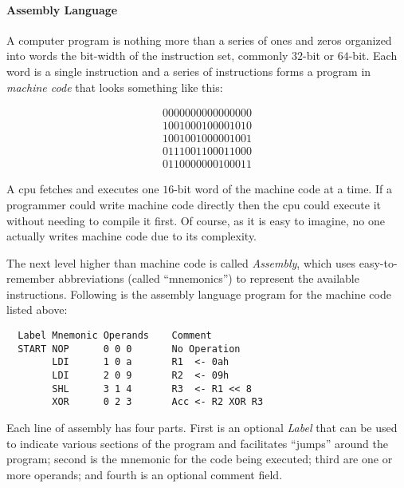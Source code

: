\paragraph{Assembly Language} A computer program is nothing more than a series of ones and zeros organized into words the bit-width of the instruction set,  commonly $ 32 $-bit or $ 64 $-bit. Each word is a single instruction and a series of instructions forms a program in \emph{machine code} that looks something like this:

\begin{align}
  \label{SIM:eq:sample_machine_code}
  0000 0000 0000 0000\\
  \nonumber
  1001 0001 0000 1010\\
  \nonumber
  1001 0010 0000 1001\\
  \nonumber
  0111 0011 0001 1000\\
  \nonumber
  0110 0000 0010 0011
\end{align}

A \gls{cpu} fetches and executes one $ 16 $-bit word of the machine code at a time. If a programmer could write machine code directly then the \gls{cpu} could execute it without needing to compile it first. Of course, as it is easy to imagine, no one actually writes machine code due to its complexity. 

The next level higher than machine code is called \emph{Assembly}, which uses easy-to-remember abbreviations (called ``mnemonics'') to represent the available  instructions. Following is the assembly language program for the machine code listed above:

\begin{verbatim}
  Label Mnemonic Operands    Comment
  START NOP      0 0 0       No Operation
        LDI      1 0 a       R1  <- 0ah
        LDI      2 0 9       R2  <- 09h
        SHL      3 1 4       R3  <- R1 << 8
        XOR      0 2 3       Acc <- R2 XOR R3
\end{verbatim}

Each line of assembly has four parts. First is an optional \emph{Label} that can be used to indicate various sections of the program and facilitates ``jumps'' around the program; second is the mnemonic for the code being executed; third are one or more operands; and fourth is an optional comment field.


